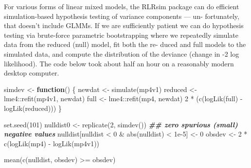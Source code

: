 \documentclass[
  12pt,
]{book}
\newenvironment{Shaded}{\begin{snugshade}}{\end{snugshade}}
\newcommand{\ControlFlowTok}[1]{\textcolor[rgb]{0.13,0.29,0.53}{\textbf{#1}}}
\newcommand{\DecValTok}[1]{\textcolor[rgb]{0.00,0.00,0.81}{#1}}
\newcommand{\DocumentationTok}[1]{\textcolor[rgb]{0.56,0.35,0.01}{\textbf{\textit{#1}}}}
\newcommand{\FloatTok}[1]{\textcolor[rgb]{0.00,0.00,0.81}{#1}}
\newcommand{\FunctionTok}[1]{\textcolor[rgb]{0.00,0.00,0.00}{#1}}
\newcommand{\NormalTok}[1]{#1}
\newcommand{\OtherTok}[1]{\textcolor[rgb]{0.56,0.35,0.01}{#1}}
\newcommand{\SpecialCharTok}[1]{\textcolor[rgb]{0.00,0.00,0.00}{#1}}
\begin{document}
For various forms of linear mixed models, the RLRsim package can do efficient simulation-based hypothesis testing of variance components --- un- fortunately, that doesn't include GLMMs.
If we are sufficiently patient we can do hypothesis testing via brute-force parametric bootstrapping where we repeatedly simulate data from the reduced (null) model, fit both the re- duced and full models to the simulated data, and compute the distribution of the deviance (change in -2 log likelihood).
The code below took about half an hour on a reasonably modern desktop computer.

\begin{Shaded}
\begin{Highlighting}[]
\NormalTok{simdev }\OtherTok{\textless{}{-}} \ControlFlowTok{function}\NormalTok{() \{}
\NormalTok{  newdat }\OtherTok{\textless{}{-}} \FunctionTok{simulate}\NormalTok{(mp4v1)}
\NormalTok{  reduced }\OtherTok{\textless{}{-}}\NormalTok{ lme4}\SpecialCharTok{::}\FunctionTok{refit}\NormalTok{(mp4v1, newdat)}
\NormalTok{  full }\OtherTok{\textless{}{-}}\NormalTok{ lme4}\SpecialCharTok{::}\FunctionTok{refit}\NormalTok{(mp4, newdat)}
  \DecValTok{2} \SpecialCharTok{*}\NormalTok{ (}\FunctionTok{c}\NormalTok{(}\FunctionTok{logLik}\NormalTok{(full) }\SpecialCharTok{{-}} \FunctionTok{logLik}\NormalTok{(reduced)))}
\NormalTok{\}}

\FunctionTok{set.seed}\NormalTok{(}\DecValTok{101}\NormalTok{)}
\NormalTok{nulldist0 }\OtherTok{\textless{}{-}} \FunctionTok{replicate}\NormalTok{(}\DecValTok{2}\NormalTok{, }\FunctionTok{simdev}\NormalTok{())}
\DocumentationTok{\#\# zero spurious (small) negative values}
\NormalTok{nulldist[nulldist }\SpecialCharTok{\textless{}} \DecValTok{0} \SpecialCharTok{\&} \FunctionTok{abs}\NormalTok{(nulldist) }\SpecialCharTok{\textless{}} \FloatTok{1e{-}5}\NormalTok{] }\OtherTok{\textless{}{-}} \DecValTok{0}
\NormalTok{obsdev }\OtherTok{\textless{}{-}} \DecValTok{2} \SpecialCharTok{*} \FunctionTok{c}\NormalTok{(}\FunctionTok{logLik}\NormalTok{(mp4) }\SpecialCharTok{{-}} \FunctionTok{logLik}\NormalTok{(mp4v1))}
\end{Highlighting}
\end{Shaded}

\begin{Shaded}
\begin{Highlighting}[]
\FunctionTok{mean}\NormalTok{(}\FunctionTok{c}\NormalTok{(nulldist, obsdev) }\SpecialCharTok{\textgreater{}=}\NormalTok{ obsdev)}
\end{Highlighting}
\end{Shaded}
\end{document}
